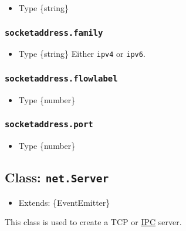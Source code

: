 \begin{itemize}
\tightlist
\item
  Type \{string\}
\end{itemize}

\subsubsection{\texorpdfstring{\texttt{socketaddress.family}}{socketaddress.family}}\label{socketaddress.family}

\begin{itemize}
\tightlist
\item
  Type \{string\} Either
  \texttt{\textquotesingle{}ipv4\textquotesingle{}} or
  \texttt{\textquotesingle{}ipv6\textquotesingle{}}.
\end{itemize}

\subsubsection{\texorpdfstring{\texttt{socketaddress.flowlabel}}{socketaddress.flowlabel}}\label{socketaddress.flowlabel}

\begin{itemize}
\tightlist
\item
  Type \{number\}
\end{itemize}

\subsubsection{\texorpdfstring{\texttt{socketaddress.port}}{socketaddress.port}}\label{socketaddress.port}

\begin{itemize}
\tightlist
\item
  Type \{number\}
\end{itemize}

\subsection{\texorpdfstring{Class:
\texttt{net.Server}}{Class: net.Server}}\label{class-net.server}

\begin{itemize}
\tightlist
\item
  Extends: \{EventEmitter\}
\end{itemize}

This class is used to create a TCP or \hyperref[ipc-support]{IPC}
server.

